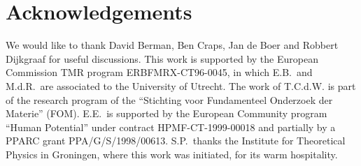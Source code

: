 \documentclass[12pt,a4paper]{article}
\begin{document}
\section{Acknowledgements}

We would like to thank David Berman, Ben Craps, Jan de Boer and
 Robbert Dijkgraaf
 for useful discussions.  This work is supported by the European
 Commission TMR program ERBFMRX-CT96-0045, in which E.B.~and M.d.R.~are
 associated to the University of Utrecht. The work of T.C.d.W. is part of
 the research program of the ``Stichting voor Fundamenteel Onderzoek der
 Materie'' (FOM). E.E.\ is supported by the European Community program
 ``Human Potential'' under contract HPMF-CT-1999-00018 and partially
 by a PPARC grant PPA/G/S/1998/00613. S.P.\ thanks the Institute for
 Theoretical Physics in Groningen, where this work was initiated,
 for its warm hospitality.
\end{document}
